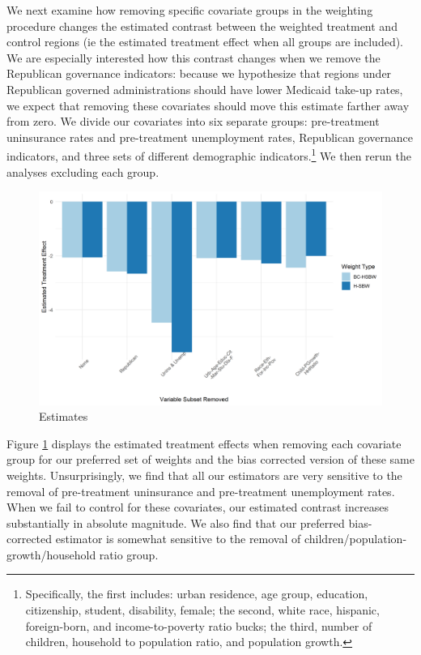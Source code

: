 \documentclass[12pt]{article}
\begin{document}
We next examine how removing specific covariate groups in the weighting procedure changes the estimated contrast between the weighted treatment and control regions (ie the estimated treatment effect when all groups are included). We are especially interested how this contrast changes when we remove the Republican governance indicators: because we hypothesize that regions under Republican governed administrations should have lower Medicaid take-up rates, we expect that removing these covariates should move this estimate farther away from zero. We divide our covariates into six separate groups: pre-treatment uninsurance rates and pre-treatment unemployment rates, Republican governance indicators, and three sets of different demographic indicators.\footnote{Specifically, the first includes: urban residence, age group, education, citizenship, student, disability, female; the second, white race, hispanic, foreign-born, and income-to-poverty ratio bucks; the third, number of children, household to population ratio, and population growth.} We then rerun the analyses excluding each group. 

\begin{figure}[]
\begin{center}
    \includegraphics[scale=0.6]{01_Plots/loo-covariates-main-c1.png}
    \caption{Estimates}
    \label{loocovariates}
\end{center}
\end{figure}

Figure \ref{loocovariates} displays the estimated treatment effects when removing each covariate group for our preferred set of weights and the bias corrected version of these same weights. Unsurprisingly, we find that all our estimators are very sensitive to the removal of pre-treatment uninsurance and pre-treatment unemployment rates. When we fail to control for these covariates, our estimated contrast increases substantially in absolute magnitude. We also find that our preferred bias-corrected estimator is somewhat sensitive to the removal of children/population-growth/household ratio group. 
\end{document}
